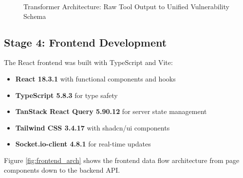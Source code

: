 \documentclass[12pt,a4paper]{report}
\begin{document}
\begin{figure}[H]
\caption{Transformer Architecture: Raw Tool Output to Unified Vulnerability Schema}
\label{fig:transformer_pipeline}
\end{figure}
\clearpage
\subsection{Stage 4: Frontend Development}

The React frontend was built with TypeScript and Vite:

\begin{itemize}
    \item \textbf{React 18.3.1} with functional components and hooks
    \item \textbf{TypeScript 5.8.3} for type safety
    \item \textbf{TanStack React Query 5.90.12} for server state management
    \item \textbf{Tailwind CSS 3.4.17} with shadcn/ui components
    \item \textbf{Socket.io-client 4.8.1} for real-time updates
\end{itemize}

Figure \ref{fig:frontend_arch} shows the frontend data flow architecture from page components down to the backend API.
\end{document}
